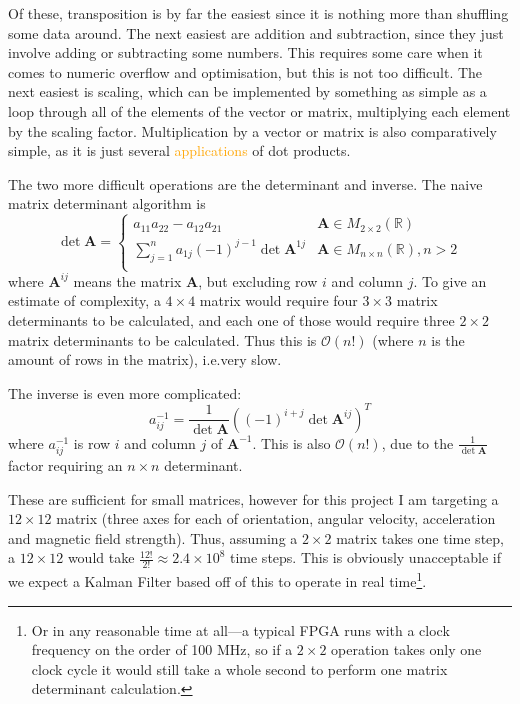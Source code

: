 \documentclass[12pt]{article}
\newcommand{\change}[2][]{\textcolor{orange}{#2}}
\begin{document}
Of these, transposition is by far the easiest since it is nothing more than shuffling some data around. The next easiest are addition and subtraction, since they just involve adding or subtracting some numbers. This requires some care when it comes to numeric overflow and optimisation, but this is not too difficult. The next easiest is scaling, which can be implemented by something as simple as a loop through all of the elements of the vector or matrix, multiplying each element by the scaling factor. Multiplication by a vector or matrix is also comparatively simple, as it is just several \change{applications} of dot products.

The two more difficult operations are the determinant and inverse. The naive matrix determinant algorithm \cite{strang2006linear} is
\begin{equation}
	\det{\mathbf{A}} = 
	\begin{cases}
	a_{11}a_{22} - a_{12}a_{21}& \mathbf{A} \in M_{2 \times 2}(\mathbb{R})\\
	\sum_{j=1}^{n} a_{1j}  (-1)^{j-1}\det{\mathbf{A}^{1j}} & \mathbf{A} \in M_{n \times n}(\mathbb{R}), n > 2\\
	\end{cases}
\end{equation}
where $\mathbf{A}^{ij}$ means the matrix $\mathbf{A}$, but excluding row $i$ and column $j$. To give an estimate of complexity, a $4\times4$ matrix would require four $3\times3$ matrix determinants to be calculated, and each one of those would require three $2\times2$ matrix determinants to be calculated. Thus this is $\mathcal{O}(n!)$ (where $n$ is the amount of rows in the matrix), i.e.\@ very slow.

The inverse is even more complicated:
\begin{equation}
	a^{-1}_{ij} = \frac{1}{\det{\mathbf{A}}} \left((-1)^{i+j} \det{\mathbf{A}^{ij}}\right)^T
\end{equation}
where $a^{-1}_{ij}$ is row $i$ and column $j$ of $\mathbf{A}^{-1}$. This is also $\mathcal{O}(n!)$, due to the $\frac{1}{\det{\mathbf{A}}}$ factor requiring an $n \times n$ determinant.

These are sufficient for small matrices, however for this project I am targeting a $12 \times 12$ matrix (three axes for each of orientation, angular velocity, acceleration and magnetic field strength). Thus, assuming a $2\times2$ matrix takes one time step, a $12 \times 12$ would take $\frac{12!}{2!} \approx 2.4 \times 10^8$ time steps. This is obviously unacceptable if we expect a Kalman Filter based off of this to operate in real time\footnote{Or in any reasonable time at all---a typical FPGA runs with a clock frequency on the order of 100 MHz, so if a $2\times2$ operation takes only one clock cycle it would still take a whole second to perform one matrix determinant calculation.}.
\end{document}
